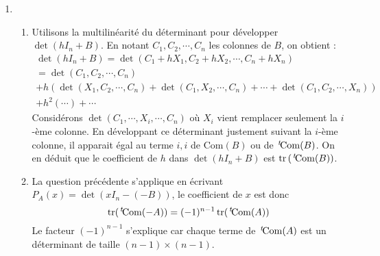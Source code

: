\begin{enumerate}
\[(x-a_{1\,1})(x-a_{2\,2})\cdots (x-a_{n\,n})\]
Le coefficient dominant de $P_A$ est 1, celui du terme de degr{\'e} $n-1$ est $-\tr (A)$.
\item
  \begin{enumerate}
  \item Utilisons la multilin{\'e}arit{\'e} du d{\'e}terminant pour d{\'e}velopper $\det (h I_n+B)$. En notant $C_1,C_2,\cdots,C_n$ les colonnes de $B$, on obtient :
\begin{multline*}
\det (h I_n + B)=  \det (C_1+hX_1,C_2+hX_2,\cdots,C_n+hX_n)\\
= \det (C_1,C_2,\cdots,C_n) \\
+h\left(  \det (X_1,C_2,\cdots,C_n) + \det (C_1,X_2,\cdots,C_n) + \cdots  + \det (C_1,C_2,\cdots,X_n)\right)\\
  +h^2( \cdots)+\cdots
\end{multline*}
Consid{\'e}rons $\det (C_1,\cdots,X_i,\cdots,C_n)$ o{\`u} $X_i$ vient remplacer seulement la $i$-{\`e}me colonne. En d{\'e}veloppant ce d{\'e}terminant justement suivant la $i$-{\`e}me colonne, il apparait {\'e}gal au terme $i,i$ de $\mathrm{Com}(B)$ ou de $\,\mathstrut^t\! \mathrm{Com}(B)$. On en d{\'e}duit que le coefficient de $h$ dans  $\det (h I_n+B)$ est $\operatorname{tr} \left( \,\mathstrut^t\!\mathrm{Com}(B)\right) $.
  \item La question pr{\'e}c{\'e}dente s'applique en {\'e}crivant $P_A(x)=\det(xI_n-(-B))$, le coefficient de $x$ est donc
\begin{displaymath}
 \operatorname{tr} (\,\mathstrut^t\! \mathrm{Com}(-A)) = (-1)^{n-1}\operatorname{tr} (\,\mathstrut^t\!\mathrm{Com}(A))
\end{displaymath}
Le facteur $(-1)^{n-1}$ s'explique car chaque terme de $\,\mathstrut^t\!\mathrm{Com}(A)$ est un d{\'e}terminant de taille $(n-1)\times(n-1)$.
  \end{enumerate}
\end{enumerate}

